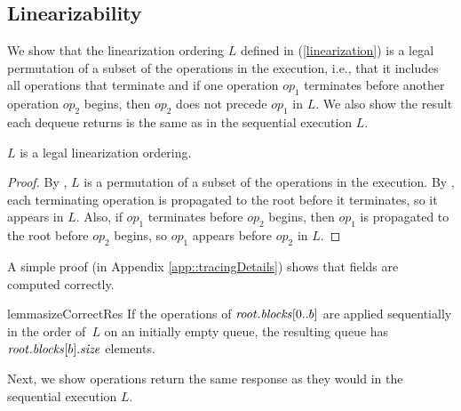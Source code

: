 \subsection{Linearizability}
\label{sec::linearizability}

We show that the linearization ordering $L$ defined in 
(\ref{linearization}) is a legal permutation of a subset of the operations in 
the execution, i.e., that it includes all operations that terminate and 
if one operation $op_1$ terminates before another operation $op_2$ begins, then $op_2$ does not precede $op_1$ in $L$.  We also show the result each dequeue returns is the same as in the sequential execution  $L$.

\begin{lemma} \label{linearSat}
$L$ is a legal linearization ordering.
\end{lemma}
\begin{proof}
By , $L$ is a permutation of a subset of the operations in the execution.
By , each terminating operation is propagated to the root before it terminates,
so it appears in $L$.
Also, if $op_{1}$ terminates before $op_{2}$ begins, then $op_{1}$ 
is propagated to the root before $op_2$ begins, so $op_1$ appears before $op_2$ in $L$.
\end{proof}

A simple proof (in Appendix \ref{app::tracingDetails}) shows that  fields are computed correctly.
\begin{restatable}{lemma}{sizeCorrectRes}
\label{sizeCorrectness}
If the operations of $\mbox{\textnormal{\textit{root}}}.\mbox{\textit{blocks}}[0..b]$ are applied sequentially in the order of~$L$ on an initially empty queue, the resulting queue has $\mbox{\textnormal{\textit{root}}}.\mbox{\textit{blocks}}[b].\mbox{\textit{size}}$ elements.  
\end{restatable}

Next, we show operations return the same response as they would in the sequential execution $L$.

